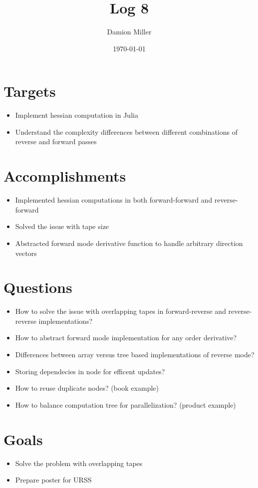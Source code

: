 \documentclass[12pt, letterpaper]{article}
\title{Log 8}
\author{Damion Miller}
\date{\today}
\begin{document}
\maketitle
\section*{Targets}
\begin{itemize}
\item Implement hessian computation in Julia
\item Understand the complexity differences between different combinations of reverse and forward passes
\end{itemize}

\section*{Accomplishments}
\begin{itemize}
\item Implemented hessian computations in both forward-forward and reverse-forward
\item Solved the issue with tape size
\item Abstracted forward mode derivative function to handle arbitrary direction vectors
\end{itemize}

\section*{Questions}
\begin{itemize}
\item How to solve the issue with overlapping tapes in forward-reverse and reverse-reverse implementations?
\item How to abstract forward mode implementation for any order derivative?
\item Differences between array versus tree based implementations of reverse mode?
\item Storing dependecies in node for efficent updates?
\item How to reuse duplicate nodes? (book example)
\item How to balance computation tree for parallelization? (product example)
\end{itemize}

\section*{Goals}
\begin{itemize}
\item Solve the problem with overlapping tapes
\item Prepare poster for URSS
\end{itemize}
\end{document}
